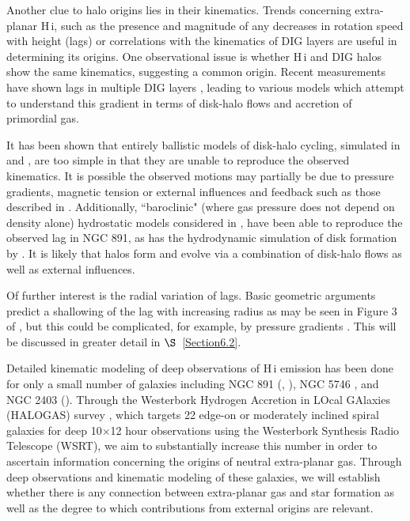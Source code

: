 \documentclass{emulateapj}
\begin{document}
\par
    Another clue to halo origins lies in their kinematics.  Trends concerning extra-planar {\sc H\,i}, such as the presence and magnitude of any decreases in rotation speed with height (lags) or correlations with the kinematics of DIG layers are useful in determining its origins.  One observational issue is whether {\sc H\,i} and DIG halos show the same kinematics, suggesting a common origin.    Recent measurements have shown lags in multiple DIG layers \citep{2007ApJ...663..933H}, leading to various models which attempt to understand this gradient in terms of disk-halo flows and accretion of primordial gas. 

\par
     It has been shown that entirely ballistic models of disk-halo cycling, simulated in \citet{2002ApJ...578...98C} and \citet{2006MNRAS.366..449F}, are too simple in that they are unable to reproduce the observed kinematics.  It is possible the observed motions may partially be due to pressure gradients, magnetic tension \citep{2002ASPC..276..201B} or external influences and feedback such as those described in \citet{2008MNRAS.386..935F}.  Additionally, ``baroclinic" (where gas pressure does not depend on density alone) hydrostatic models considered in \citet{2006A&A...446...61B}, have been able to reproduce the observed lag in NGC 891, as has the hydrodynamic simulation of disk formation by \citet{2006MNRAS.370.1612K}. It is likely that halos form and evolve via a combination of disk-halo flows as well as external influences.

\par
     Of further interest is the radial variation of lags.  Basic geometric arguments predict a shallowing of the lag with increasing radius as may be seen in Figure 3 of \citet{2002ApJ...578...98C}, but this could be complicated, for example, by pressure gradients \citep{2002ASPC..276..201B}.  This will be discussed in greater detail in $\S$~\ref{Section6.2}.

\par
     Detailed kinematic modeling of deep observations of {\sc H\,i} emission has been done for only a small number of galaxies including NGC 891 (\citealt{1997ApJ...491..140S}, \citealt{2007AJ....134.1019O}), NGC 5746 \citep{2008ApJ...676..991R}, and NGC 2403 (\citealt{2002AJ....123.3124F}). Through the Westerbork Hydrogen Accretion in LOcal GAlaxies (HALOGAS) survey \citep{2011A&A...526A.118H},  which targets 22 edge-on or moderately inclined spiral galaxies for deep 10$\times$12 hour observations using the Westerbork Synthesis Radio Telescope (WSRT), we aim to substantially increase this number in order to ascertain information concerning the origins of neutral extra-planar gas.  Through deep observations and kinematic modeling of these galaxies, we will establish whether there is any connection between extra-planar gas and star formation as well as the degree to which contributions from external origins are relevant.  
\end{document}
